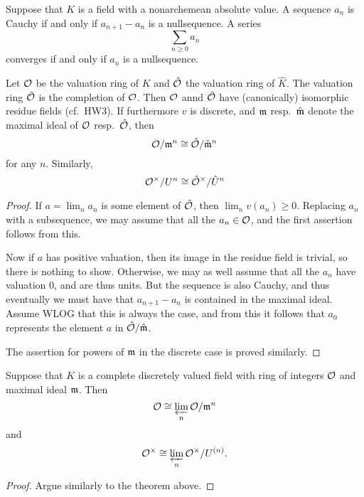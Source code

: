 \begin{exercise}
  Suppose that $K$ is a field with a nonarchemean absolute value.
  A sequence $a_{n}$ is Cauchy if and only if $a_{n+1}-a_{n}$ is a nullsequence.
  A series
  \[ \sum_{n \geq 0} a_{n} \]
  converges if and only if $a_{n}$ is a nullsequence.
\end{exercise}

\begin{theorem}
  Let $\mathcal{O}$ be the valuation ring of $K$ and $\hat {\mathcal{O}}$ the valuation ring of $\hat K$.
  The valuation ring $\hat{\mathcal{O}}$ is the completion of $\mathcal{O}$.
  Then $\mathcal{O}$ annd $\hat{\mathcal{O}}$ have (canonically) isomorphic residue fields (cf.~HW3).
  If furthermore $v$ is discrete, and $\mathfrak{m}$ resp.~$\hat{\mathfrak{m}}$ denote the maximal ideal of $\mathcal{O}$ resp.~$\hat{\mathcal{O}}$, then
  \[ \mathcal{O}/\mathfrak{m}^{n} \cong \hat{\mathcal{O}}/\hat{\mathfrak{m}}^{n} \]
  for any $n$.
  Similarly,
  \[ \mathcal{O}^{\times}/U^{n} \cong \hat{\mathcal{O}}^{\times}/\hat U^{n} \]
\end{theorem}
\begin{proof}
  If $a = \lim_{n} a_{n}$ is some element of $\hat{\mathcal{O}}$, then $\lim_{n} v(a_{n}) \geq 0$.
  Replacing $a_{n}$ with a subsequence, we may assume that all the $a_{n} \in \mathcal{O}$, and the first assertion follows from this.

  Now if $a$ has positive valuation, then its image in the residue field is trivial, so there is nothing to show.
  Otherwise, we may as well assume that all the $a_{n}$ have valuation $0$, and are thus units.
  But the sequence is also Cauchy, and thus eventually we must have that $a_{n+1}-a_{n}$ is contained in the maximal ideal.
  Assume WLOG that this is always the case, and from this it follows that $a_{0}$ represents the element $a$ in $\hat{\mathcal{O}}/\hat{\mathfrak{m}}$.

  The assertion for powers of $\mathfrak{m}$ in the discrete case is proved similarly.
\end{proof}

\begin{theorem}
  Suppose that $K$ is a complete discretely valued field with ring of integers $\mathcal{O}$ and maximal ideal $\mathfrak{m}$.
  Then
  \[ \mathcal{O} \cong \varprojlim_{n} \mathcal{O}/\mathfrak{m}^{n} \]
  and
  \[ \mathcal{O}^{\times} \cong \varprojlim_{n} \mathcal{O}^{\times}/U^{(n)}. \]
\end{theorem}
\begin{proof}
  Argue similarly to the theorem above.
\end{proof}

